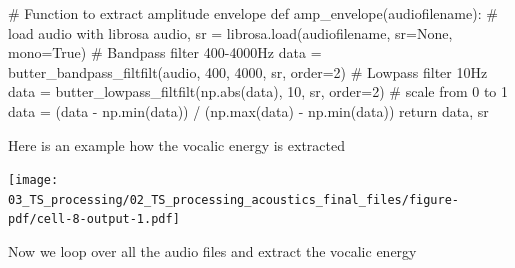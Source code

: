 \documentclass[
  letterpaper,
  DIV=11,
  numbers=noendperiod]{scrreprt}
\newenvironment{Shaded}{\begin{snugshade}}{\end{snugshade}}
\newcommand{\BuiltInTok}[1]{\textcolor[rgb]{0.00,0.23,0.31}{#1}}
\newcommand{\CommentTok}[1]{\textcolor[rgb]{0.37,0.37,0.37}{#1}}
\newcommand{\ControlFlowTok}[1]{\textcolor[rgb]{0.00,0.23,0.31}{#1}}
\newcommand{\DecValTok}[1]{\textcolor[rgb]{0.68,0.00,0.00}{#1}}
\newcommand{\KeywordTok}[1]{\textcolor[rgb]{0.00,0.23,0.31}{#1}}
\newcommand{\NormalTok}[1]{\textcolor[rgb]{0.00,0.23,0.31}{#1}}
\newcommand{\OperatorTok}[1]{\textcolor[rgb]{0.37,0.37,0.37}{#1}}
\newcommand{\VariableTok}[1]{\textcolor[rgb]{0.07,0.07,0.07}{#1}}
\begin{document}
\begin{Shaded}
\begin{Highlighting}[]
\CommentTok{\# Function to extract amplitude envelope}
\KeywordTok{def}\NormalTok{ amp\_envelope(audiofilename):}
    \CommentTok{\# load audio with librosa}
\NormalTok{    audio, sr }\OperatorTok{=}\NormalTok{ librosa.load(audiofilename, sr}\OperatorTok{=}\VariableTok{None}\NormalTok{, mono}\OperatorTok{=}\VariableTok{True}\NormalTok{)}
    \CommentTok{\# Bandpass filter 400{-}4000Hz}
\NormalTok{    data }\OperatorTok{=}\NormalTok{ butter\_bandpass\_filtfilt(audio, }\DecValTok{400}\NormalTok{, }\DecValTok{4000}\NormalTok{, sr, order}\OperatorTok{=}\DecValTok{2}\NormalTok{)}
    \CommentTok{\# Lowpass filter 10Hz}
\NormalTok{    data }\OperatorTok{=}\NormalTok{ butter\_lowpass\_filtfilt(np.}\BuiltInTok{abs}\NormalTok{(data), }\DecValTok{10}\NormalTok{, sr, order}\OperatorTok{=}\DecValTok{2}\NormalTok{)}
    \CommentTok{\# scale from 0 to 1}
\NormalTok{    data }\OperatorTok{=}\NormalTok{ (data }\OperatorTok{{-}}\NormalTok{ np.}\BuiltInTok{min}\NormalTok{(data)) }\OperatorTok{/}\NormalTok{ (np.}\BuiltInTok{max}\NormalTok{(data) }\OperatorTok{{-}}\NormalTok{ np.}\BuiltInTok{min}\NormalTok{(data))}
    \ControlFlowTok{return}\NormalTok{ data, sr}
\end{Highlighting}
\end{Shaded}

Here is an example how the vocalic energy is extracted

\texttt{[image: 03\_TS\_processing/02\_TS\_processing\_acoustics\_final\_files/figure-pdf/cell-8-output-1.pdf]}

Now we loop over all the audio files and extract the vocalic energy
\end{document}
